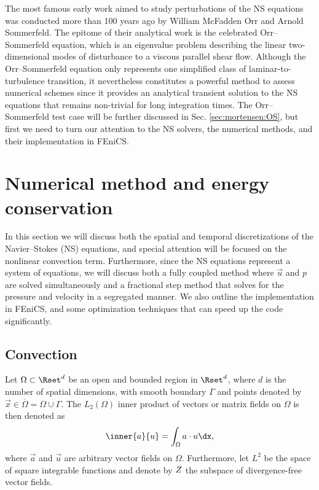 The most famous early work aimed to study perturbations of the NS
equations was conducted more than 100 years ago by William McFadden
Orr and Arnold Sommerfeld. The epitome of their analytical work
is the celebrated Orr--Sommerfeld equation, which is an eigenvalue
problem describing the linear two-dimensional modes of disturbance to a
viscous parallel shear flow. Although the Orr--Sommerfeld equation only
represents one simplified class of laminar-to-turbulence transition, it
nevertheless constitutes a powerful method to assess numerical schemes
since it provides an analytical transient solution to the NS equations
that remains non-trivial for long integration times. The Orr--Sommerfeld
test case will be further discussed in Sec. \ref{sec:mortensen:OS},
but first we need to turn our attention to the NS solvers, the numerical
methods, and their implementation in FEniCS.

\section{Numerical method and energy conservation}
\label{sec:mortensen:Numerical}

In this section we will discuss both the spatial and temporal
discretizations of the Navier--Stokes (NS) equations, and special
attention will be focused on the nonlinear convection
term. Furthermore, since the NS equations represent a system of
equations, we will discuss both a fully coupled method where $\vec{u}$
and $p$ are solved simultaneously and a fractional step method that
solves for the pressure and velocity in a segregated manner. We also
outline the implementation in FEniCS, and some optimization techniques
that can speed up the code significantly.

\subsection{Convection}
\label{sec:mortensen:Convection}

Let $\Omega \subset \Rset^d$ be an open and bounded region in $\Rset^d$,
where $d$ is the number of spatial dimensions, with smooth boundary
$\Gamma$ and points denoted by $\vec{x}\in \overline{\Omega}=\Omega \cup
\Gamma$. The $L_2(\Omega)$ inner product of vectors or matrix fields on
$\Omega$ is then denoted as
\begin{equation}
 \inner{\vec{a}}{\vec{u}} = \int_{\Omega} \vec{a}\cdot \vec{u} \dx,
 \label{eq:mortensen:L2}
\end{equation}
where $\vec{a}$ and $\vec{u}$ are arbitrary vector fields on
$\Omega$. Furthermore, let $L^2$ be the space of square integrable
functions and denote by $Z$ the subspace of divergence-free
vector fields.

